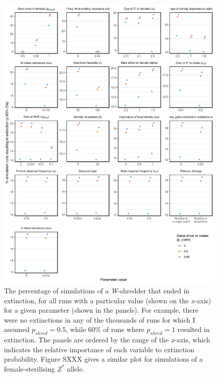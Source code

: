 \documentclass[]{rsos}%
\begin{document}
\begin{figure}[h]
\centering
\includegraphics[width=1.0\textwidth]{../figures/figure3.pdf}
\caption{\footnotesize{The percentage of simulations of a \textit{W}-shredder that ended in extinction, for all runs with a particular value (shown on the \textit{x}-axis) for a given parameter (shown in the panels). For example, there were no extinctions in any of the thousands of runs for which I assumed $p_{shred} = 0.5$, while 60\% of runs where $p_{shred} = 1$ resulted in extinction. The panels are ordered by the range of the \textit{x}-axis, which indicates the relative importance of each variable to extinction probability. Figure SXXX gives a similar plot for simulations of a female-sterilising $Z^*$ allele.}}
\end{figure}
\newpage
\end{document}
